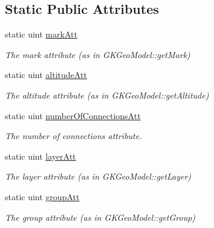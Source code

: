 \subsection*{Static Public Attributes}
\begin{DoxyCompactItemize}
\item 
static uint \hyperlink{classGKGeoObject_af44e0720cc5baca36c2995219ec7846c}{mark\+Att}\hypertarget{classGKGeoObject_af44e0720cc5baca36c2995219ec7846c}{}\label{classGKGeoObject_af44e0720cc5baca36c2995219ec7846c}

\begin{DoxyCompactList}\small\item\em The mark attribute (as in G\+K\+Geo\+Model\+::get\+Mark) \end{DoxyCompactList}\item 
static uint \hyperlink{classGKGeoObject_a08676fb7e1a8afff241442c10fe3aec6}{altitude\+Att}\hypertarget{classGKGeoObject_a08676fb7e1a8afff241442c10fe3aec6}{}\label{classGKGeoObject_a08676fb7e1a8afff241442c10fe3aec6}

\begin{DoxyCompactList}\small\item\em The altitude attribute (as in G\+K\+Geo\+Model\+::get\+Altitude) \end{DoxyCompactList}\item 
static uint \hyperlink{classGKGeoObject_a2d2a3be13580143b887d208a02c61734}{number\+Of\+Connections\+Att}\hypertarget{classGKGeoObject_a2d2a3be13580143b887d208a02c61734}{}\label{classGKGeoObject_a2d2a3be13580143b887d208a02c61734}

\begin{DoxyCompactList}\small\item\em The number of connections attribute. \end{DoxyCompactList}\item 
static uint \hyperlink{classGKGeoObject_a9c27b0e72bcbbb5fa5a03703ab3d55e9}{layer\+Att}\hypertarget{classGKGeoObject_a9c27b0e72bcbbb5fa5a03703ab3d55e9}{}\label{classGKGeoObject_a9c27b0e72bcbbb5fa5a03703ab3d55e9}

\begin{DoxyCompactList}\small\item\em The layer attribute (as in G\+K\+Geo\+Model\+::get\+Layer) \end{DoxyCompactList}\item 
static uint \hyperlink{classGKGeoObject_a601ea581178a33ab3c9921aff0e0ba91}{group\+Att}\hypertarget{classGKGeoObject_a601ea581178a33ab3c9921aff0e0ba91}{}\label{classGKGeoObject_a601ea581178a33ab3c9921aff0e0ba91}

\begin{DoxyCompactList}\small\item\em The group attribute (as in G\+K\+Geo\+Model\+::get\+Group) \end{DoxyCompactList}\end{DoxyCompactItemize}
